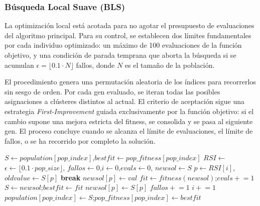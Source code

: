 \documentclass[a4paper,12pt]{article}%
\begin{document}
\subsubsection*{Búsqueda Local Suave (BLS)}

\noindent La optimización local está acotada para no agotar el presupuesto de evaluaciones del 
algoritmo principal. Para su control, se establecen dos límites fundamentales por cada 
individuo optimizado: un máximo de 100 evaluaciones de la función objetivo, y una 
condición de parada temprana que aborta la búsqueda si se acumulan $\epsilon = \lfloor 
0.1 \cdot N \rfloor$ fallos, donde $N$ es el tamaño de la población.

El procedimiento genera una permutación aleatoria de los índices para recorrerlos sin 
sesgo de orden. Por cada gen evaluado, se iteran todas las posibles asignaciones a 
clústeres distintos al actual. El criterio de aceptación sigue una estrategia 
\textit{First-Improvement} guiada exclusivamente por la función objetivo: si el cambio 
supone una mejora estricta del fitness, se consolida y se pasa al siguiente gen. El proceso 
concluye cuando se alcanza el límite de evaluaciones, el límite de fallos, o se ha 
recorrido por completo la solución.

\begin{algorithm}[H]
	\begin{algorithmic}
		\State $S \leftarrow population[pop\_index]$,\quad $bestfit \leftarrow pop\_fitness[pop\_index]$
		\State $RSI \leftarrow$ 
		\State $\epsilon \leftarrow \lfloor 0.1 \cdot pop\_size \rfloor$, \quad $fallos \leftarrow 0$,\quad $i \leftarrow 0$,\quad $evals \leftarrow 0$, \quad $newsol \leftarrow S$
		\State $p \leftarrow RSI[i]$,\quad $oldvalue \leftarrow S[p]$
		 \textbf{break} \EndIf
		\State $newsol[p] \leftarrow val$
		\State $fit \leftarrow fitness(newsol)$;\quad $evals \mathrel{+}= 1$
		\State $S \leftarrow newsol$;\quad $bestfit \leftarrow fit$
		\Else
		\State $newsol[p] \leftarrow S[p]$
		\EndIf
		\EndFor
		\State $fallos \mathrel{+}= 1$
		\EndIf
		\State $i \mathrel{+}= 1$
		\EndWhile
		\State $population[pop\_index] \leftarrow S$;\quad $pop\_fitness[pop\_index] \leftarrow bestfit$
		\EndFunction
	\end{algorithmic}
\end{algorithm}
\end{document}
